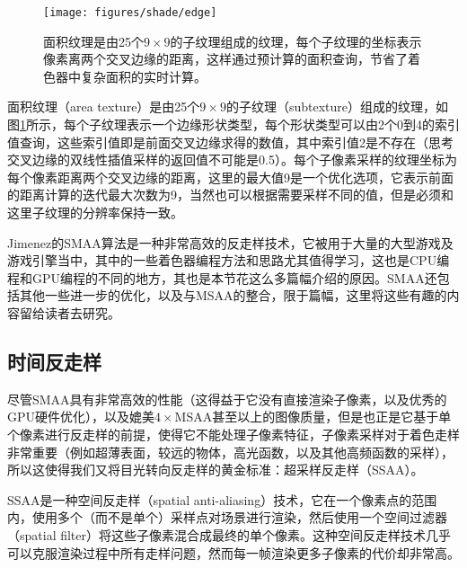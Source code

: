 \begin{figure}
\begin{fullwidth}
	\texttt{[image: figures/shade/edge]}
	\caption{面积纹理是由25个$9\times 9$的子纹理组成的纹理，每个子纹理的坐标表示像素离两个交叉边缘的距离，这样通过预计算的面积查询，节省了着色器中复杂面积的实时计算。}
	\label{f:shade-edge}
\end{fullwidth}
\end{figure}

面积纹理（area texture）是由25个$9\times 9$的子纹理（subtexture）组成的纹理，如图\ref{f:shade-edge}所示，每个子纹理表示一个边缘形状类型，每个形状类型可以由2个0到4的索引值查询，这些索引值即是前面交叉边缘求得的数值，其中索引值2是不存在（思考交叉边缘的双线性插值采样的返回值不可能是0.5）。每个子像素采样的纹理坐标为每个像素距离两个交叉边缘的距离，这里的最大值9是一个优化选项，它表示前面的距离计算的迭代最大次数为9，当然也可以根据需要采样不同的值，但是必须和这里子纹理的分辨率保持一致。

Jimenez的SMAA算法是一种非常高效的反走样技术，它被用于大量的大型游戏及游戏引擎当中，其中的一些着色器编程方法和思路尤其值得学习，这也是CPU编程和GPU编程的不同的地方，其也是本节花这么多篇幅介绍的原因。SMAA\cite{a:SMAA:EnhancedSubpixelMorphologicalAntialiasing}还包括其他一些进一步的优化，以及与MSAA的整合，限于篇幅，这里将这些有趣的内容留给读者去研究。






\subsection{时间反走样}\label{sec:shade-temporal-anti-aliasing}
尽管SMAA具有非常高效的性能（这得益于它没有直接渲染子像素，以及优秀的GPU硬件优化），以及媲美$4\times$MSAA甚至以上的图像质量，但是也正是它基于单个像素进行反走样的前提，使得它不能处理子像素特征，子像素采样对于着色走样非常重要（例如超薄表面，较远的物体，高光函数，以及其他高频函数的采样），所以这使得我们又将目光转向反走样的黄金标准：超采样反走样（SSAA）。

SSAA是一种空间反走样（spatial anti-aliasing）技术，它在一个像素点的范围内，使用多个（而不是单个）采样点对场景进行渲染，然后使用一个空间过滤器（spatial filter）将这些子像素混合成最终的单个像素。这种空间反走样技术几乎可以克服渲染过程中所有走样问题，然而每一帧渲染更多子像素的代价却非常高。

